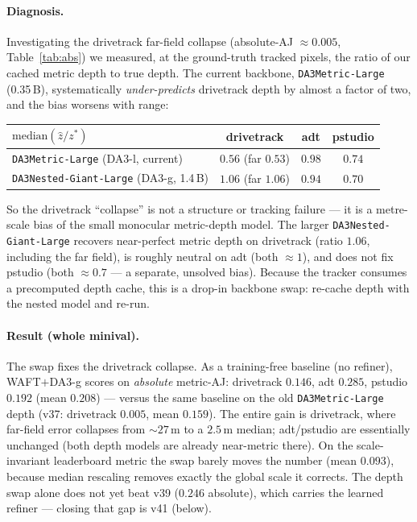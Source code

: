 \documentclass[11pt,a4paper]{article}
\begin{document}
\paragraph{Diagnosis.}
Investigating the drivetrack far-field collapse (absolute-AJ $\approx0.005$, Table~\ref{tab:abs}) we
measured, at the ground-truth tracked pixels, the ratio of our cached metric depth to true depth. The current
backbone, \texttt{DA3Metric-Large} (0.35\,B), systematically \emph{under-predicts} drivetrack depth by
almost a factor of two, and the bias worsens with range:
\begin{center}\small
\begin{tabular}{lccc}
\toprule
$\mathrm{median}(\hat z/z^{\ast})$ & drivetrack & adt & pstudio \\
\midrule
\texttt{DA3Metric-Large} (DA3-l, current) & $0.56$ (far $0.53$) & $0.98$ & $0.74$ \\
\texttt{DA3Nested-Giant-Large} (DA3-g, 1.4\,B) & $\mathbf{1.06}$ (far $1.06$) & $0.94$ & $0.70$ \\
\bottomrule
\end{tabular}
\end{center}
So the drivetrack ``collapse'' is not a structure or tracking failure --- it is a metre-scale bias of the
small monocular metric-depth model. The larger \texttt{DA3Nested-Giant-Large} recovers near-perfect metric
depth on drivetrack (ratio $1.06$, including the far field), is roughly neutral on adt (both $\approx1$),
and does not fix pstudio (both $\approx0.7$ --- a separate, unsolved bias). Because the tracker consumes a
precomputed depth cache, this is a drop-in backbone swap: re-cache depth with the nested model and re-run.

\paragraph{Result (whole minival).}
The swap fixes the drivetrack collapse. As a training-free baseline (no refiner), WAFT$+$DA3-g scores
on \emph{absolute} metric-AJ: drivetrack $0.146$, adt $0.285$, pstudio $0.192$ (mean $\mathbf{0.208}$) ---
versus the same baseline on the old \texttt{DA3Metric-Large} depth (v37: drivetrack $0.005$, mean $0.159$).
The entire gain is drivetrack, where far-field error collapses from ${\sim}27$\,m to a $2.5$\,m median;
adt/pstudio are essentially unchanged (both depth models are already near-metric there). On the
scale-invariant leaderboard metric the swap barely moves the number (mean $0.093$), because median
rescaling removes exactly the global scale it corrects. The depth swap alone does not yet beat v39 ($0.246$ absolute), which carries the learned refiner --- closing that gap is v41 (below).
\end{document}
